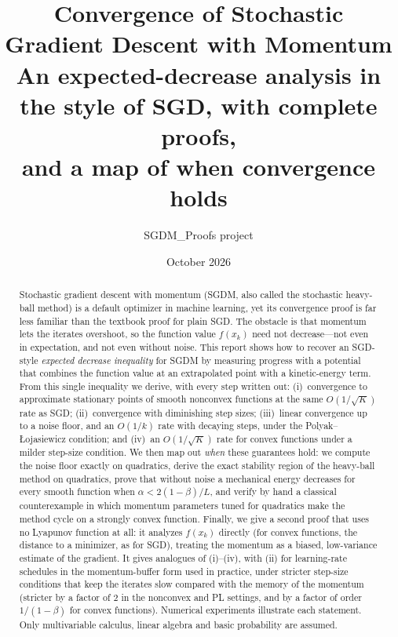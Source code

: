\documentclass[11pt]{article}
\title{\textbf{Convergence of Stochastic Gradient Descent with Momentum}\\[4pt]
  \large An expected-decrease analysis in the style of SGD, with complete proofs,\\
  and a map of when convergence holds}
\author{SGDM\_Proofs project}
\date{October 2026}
\numberwithin{equation}{section}
\theoremstyle{plain}
\theoremstyle{definition}
\theoremstyle{remark}
\begin{document}
\maketitle

\begin{abstract}
\noindent
Stochastic gradient descent with momentum (SGDM, also called the stochastic heavy-ball
method) is a default optimizer in machine learning, yet its convergence proof is far less
familiar than the textbook proof for plain SGD. The obstacle is that momentum lets the
iterates overshoot, so the function value $f(x_k)$ need not decrease---not even in
expectation, and not even without noise. This report shows how to recover an SGD-style
\emph{expected decrease inequality} for SGDM by measuring progress with a
potential that combines the function value at an extrapolated point with a kinetic-energy
term. From this single inequality we derive, with every step written out:
(i)~convergence to approximate stationary points of smooth nonconvex functions at the same
$O(1/\sqrt{K})$ rate as SGD; (ii)~convergence with diminishing step sizes; (iii)~linear
convergence up to a noise floor, and an $O(1/k)$ rate with decaying steps, under the
Polyak--{\L}ojasiewicz condition; and (iv)~an $O(1/\sqrt{K})$ rate for convex functions
under a milder step-size condition. We then map out \emph{when} these guarantees hold: we
compute the noise floor exactly on quadratics, derive the exact stability region of the
heavy-ball method on quadratics, prove that without noise a mechanical energy decreases for
every smooth function when $\alpha<2(1-\beta)/L$, and verify by hand a classical
counterexample in which momentum parameters tuned for quadratics make the method cycle on a
strongly convex function. Finally, we give a second proof that uses no Lyapunov function at all: it analyzes
$f(x_k)$ directly (for convex functions, the distance to a minimizer, as for SGD), treating the
momentum as a biased, low-variance estimate of the gradient. It gives analogues of
(i)--(iv), with (ii) for learning-rate schedules in the momentum-buffer form used in
practice, under stricter step-size conditions that keep the iterates slow compared with the
memory of the momentum (stricter by a factor of $2$ in the nonconvex and PL settings, and by
a factor of order $1/(1-\beta)$ for convex functions). Numerical experiments illustrate each statement. Only
multivariable calculus, linear algebra and basic probability are assumed.
\end{abstract}

\newpage
{\small\setlength{\parskip}{0pt}\tableofcontents}
\newpage













\appendix



\end{document}
